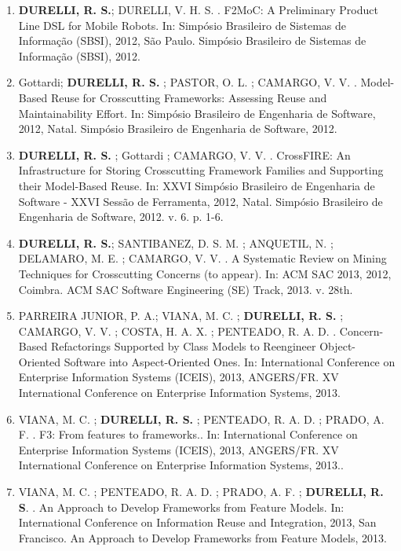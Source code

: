 \documentclass[12pt]{article}
\begin{document}
\begin{itemize}
\begin{enumerate}
	 	\item \textbf{DURELLI, R. S.}; DURELLI, V. H. S. . F2MoC: A Preliminary Product Line DSL for Mobile Robots. In: Simpósio Brasileiro de Sistemas de Informação (SBSI), 2012, São Paulo. Simpósio Brasileiro de Sistemas de Informação (SBSI), 2012.
	 	
	 	\item Gottardi; \textbf{DURELLI, R. S.} ; PASTOR, O. L. ; CAMARGO, V. V. . Model-Based Reuse for Crosscutting Frameworks: Assessing Reuse and Maintainability Effort. In: Simpósio Brasileiro de Engenharia de Software, 2012, Natal. Simpósio Brasileiro de Engenharia de Software, 2012.
	 	\item \textbf{DURELLI, R. S.} ; Gottardi ; CAMARGO, V. V. . CrossFIRE: An Infrastructure for Storing Crosscutting Framework Families and Supporting their Model-Based Reuse. In: XXVI Simpósio Brasileiro de Engenharia de Software - XXVI Sessão de Ferramenta, 2012, Natal. Simpósio Brasileiro de Engenharia de Software, 2012. v. 6. p. 1-6.
	 	
	 	\item \textbf{DURELLI, R. S.}; SANTIBANEZ, D. S. M. ; ANQUETIL, N. ; DELAMARO, M. E. ; CAMARGO, V. V. . A Systematic Review on Mining Techniques for Crosscutting Concerns (to appear). In: ACM SAC 2013, 2012, Coimbra. ACM SAC Software Engineering (SE) Track, 2013. v. 28th.
	
	 	\item PARREIRA JUNIOR, P. A.; VIANA, M. C. ; \textbf{DURELLI, R. S.} ; CAMARGO, V. V. ; COSTA, H. A. X. ; PENTEADO, R. A. D. . Concern-Based Refactorings Supported by Class Models to Reengineer Object-Oriented Software into Aspect-Oriented Ones. In: International Conference on Enterprise Information Systems (ICEIS), 2013, ANGERS/FR. XV International Conference on Enterprise Information Systems, 2013.
		
		\item VIANA, M. C. ; \textbf{DURELLI, R. S.} ; PENTEADO, R. A. D. ; PRADO, A. F. . F3: From features to frameworks.. In: International Conference on Enterprise Information Systems (ICEIS), 2013, ANGERS/FR. XV International Conference on Enterprise Information Systems, 2013..
		
		\item VIANA, M. C. ; PENTEADO, R. A. D. ; PRADO, A. F. ; \textbf{DURELLI, R. S}. . An Approach to Develop Frameworks from Feature Models. In: International Conference on Information Reuse and Integration, 2013, San Francisco. An Approach to Develop Frameworks from Feature Models, 2013.
		

\end{enumerate}
\end{itemize}
\end{document}
